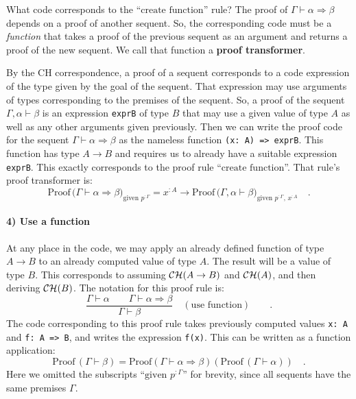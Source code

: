 What code corresponds to the \textsf{``}$\text{create function}$\textsf{''} rule?
The proof of $\Gamma\vdash\alpha\Rightarrow\beta$ depends on a proof
of another sequent. So, the corresponding code must be a \emph{function}
that takes a proof of the previous sequent as an argument and returns
a proof of the new sequent. We call that function a \textbf{proof
transformer}.

By the CH correspondence, a proof of a sequent corresponds to a code
expression of the type given by the goal of the sequent. That expression
may use arguments of types corresponding to the premises of the sequent.
So, a proof of the sequent $\Gamma,\alpha\vdash\beta$ is an expression
\lstinline!exprB! of type $B$ that may use a given value of type
$A$ as well as any other arguments given previously. Then we can
write the proof code for the sequent $\Gamma\vdash\alpha\Rightarrow\beta$
as the nameless function \lstinline!(x: A) => exprB!. This function
has type $A\rightarrow B$ and requires us to already have a suitable
expression \lstinline!exprB!. This exactly corresponds to the proof
rule \textsf{``}$\text{create function}$\textsf{''}. That rule\textsf{'}s proof transformer
is:
\[
\text{Proof}\,\big(\Gamma\vdash\alpha\Rightarrow\beta\big)_{\text{given }p^{:\Gamma}}=x^{:A}\rightarrow\text{Proof}\,\big(\Gamma,\alpha\vdash\beta\big)_{\text{given }p^{:\Gamma},\,x^{:A}}\quad.
\]


\paragraph{4) Use a function}

At any place in the code, we may apply an already defined function
of type $A\rightarrow B$ to an already computed value of type $A$.
The result will be a value of type $B$. This corresponds to assuming
${\cal CH}(A\rightarrow B)$ and ${\cal CH}(A)$, and then deriving
${\cal CH}(B)$. The notation for this proof rule is:
\[
\frac{\Gamma\vdash\alpha\quad\quad\Gamma\vdash\alpha\Rightarrow\beta}{\Gamma\vdash\beta}\quad(\text{use function})\quad\quad.
\]
The code corresponding to this proof rule takes previously computed
values \lstinline!x: A! and \lstinline!f: A => B!, and writes the
expression \lstinline!f(x)!. This can be written as a function application:
\[
\text{Proof}\,(\Gamma\vdash\beta)=\text{Proof}\left(\Gamma\vdash\alpha\Rightarrow\beta\right)(\text{Proof}\,(\Gamma\vdash\alpha))\quad.
\]
Here we omitted the subscripts \textsf{``}$\text{given }p^{:\Gamma}$\textsf{''} for
brevity, since all sequents have the same premises $\Gamma$.

